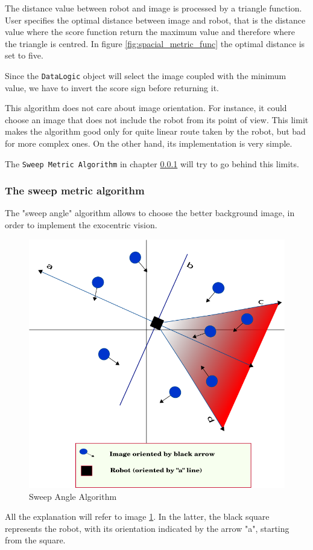 %
The distance value between robot and image is processed by a triangle function. User specifies
the optimal distance between image and robot, that is the distance value where
the score function return the maximum value and therefore where the triangle is centred.
In figure \ref{fig:spacial_metric_func} the optimal distance is set to five.
%

%
Since the \texttt{DataLogic} object will select the image coupled with the minimum value, we have
to invert the score sign before returning it.
%

%
This algorithm does not care about image orientation. For instance, it could choose an image that
does not include the robot from its point of view. This limit makes the algorithm good only for
quite linear route taken by the robot, but bad for more complex ones. On the other hand, its
implementation is very simple.
%

%
The \texttt{Sweep Metric Algorithm} in chapter \ref{subsec:sweep_metric_algorithm} will try to
go behind this limits.


\subsubsection{The sweep metric algorithm}
\label{subsec:sweep_metric_algorithm}
The "sweep angle" algorithm allows to choose the better background image, in order to implement
the exocentric vision.
%
\begin{figure}[!h]
  \begin{center}
    \includegraphics[width=400pt]{img/half_plan_finding.png} 
    \caption{Sweep Angle Algorithm}
    \label{fig:half_plan_finding}
  \end{center}
\end{figure}
%
All the explanation will refer to image \ref{fig:half_plan_finding}. In the latter, the black
square represents the robot, with its orientation indicated by the arrow "a", starting from the
square.
%

